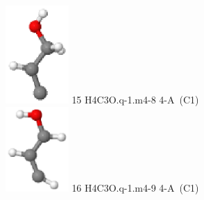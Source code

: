 \documentclass[10pt]{article}
\begin{document}
\begin{tabular}
\includegraphics[width=2.40000000000000000000cm]{H4C3O.q-1.m4-8.eps} \tiny{15 \hspace{1.20000000000000000000cm} H4C3O.q-1.m4-8 \hspace{5pt} 4-A~(C1)} 
\\\hline
\includegraphics[width=2.40000000000000000000cm]{H4C3O.q-1.m4-9.eps} \tiny{16 \hspace{1.20000000000000000000cm} H4C3O.q-1.m4-9 \hspace{5pt} 4-A~(C1)} 
\\
\end{tabular}
\end{document}

